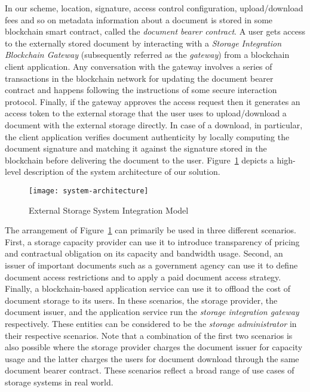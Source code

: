 In our scheme, location, signature, access control configuration, upload/download fees and so on metadata information about a document is stored in some blockchain smart contract, called the {\it document bearer contract}. A user gets access to the externally stored document by interacting with a \textit{Storage Integration Blockchain Gateway} (subsequently referred as the \textit{gateway}) from a blockchain client application. Any conversation with the gateway involves a series of transactions in the blockchain network for updating the document bearer contract and happens following the instructions of some secure interaction protocol. Finally, if the gateway approves the access request then it generates an access token to the external storage that the user uses to upload/download a document with the external storage directly. In case of a download, in particular, the client application verifies document authenticity by locally computing the document signature and matching it against the signature stored in the blockchain before delivering the document to the user. 
Figure~\ref{fig-1} depicts a high-level description of the system architecture of our solution.   
\begin{figure}[h]
\centering
\texttt{[image: system-architecture]}                    
\caption{External Storage System Integration Model}\label{fig-1}
\end{figure}

The arrangement of Figure~\ref{fig-1} can primarily be used in three different scenarios. First, a storage capacity provider can use it to introduce transparency of pricing and contractual obligation on its capacity and bandwidth usage. Second, an issuer of important documents such as a government agency can use it to define document access restrictions and to apply a paid document access strategy. Finally, a blockchain-based application service can use it to offload the cost of document storage to its users. In these scenarios, the storage provider, the document issuer, and the application service run the \textit{storage integration gateway} respectively. These entities can be considered to be the \textit{storage administrator} in their respective scenarios. Note that a combination of the first two scenarios is also possible where the storage provider charges the document issuer for capacity usage and the latter charges the users for document download through the same document bearer contract. These scenarios reflect a broad range of use cases of storage systems in real world.          

